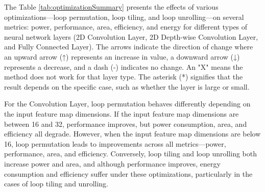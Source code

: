 \begin{table}[H]
\caption{Effect of Optimizations on Different Layers}
\label{tab:optimizationSummary}
\centering
{}
\end{table}

The Table \ref{tab:optimizationSummary} presents the effects of various optimizations—loop permutation, loop tiling, and loop unrolling—on several metrics: power, performance, area, efficiency, and energy for different types of neural network layers (2D Convolution Layer, 2D Depth-wise Convolution Layer, and Fully Connected Layer). The arrows indicate the direction of change where an upward arrow (↑) represents an increase in value, a downward arrow (↓) represents a decrease, and a dash (-) indicates no change. An "X" means the method does not work for that layer type. The asterisk (*) signifies that the result depends on the specific case, such as whether the layer is large or small.

For the Convolution Layer, loop permutation behaves differently depending on the input feature map dimensions. If the input feature map dimensions are between 16 and 32, performance improves, but power consumption, area, and efficiency all degrade. However, when the input feature map dimensions are below 16, loop permutation leads to improvements across all metrics—power, performance, area, and efficiency. Conversely, loop tiling and loop unrolling both increase power and area, and although performance improves, energy consumption and efficiency suffer under these optimizations, particularly in the cases of loop tiling and unrolling.

